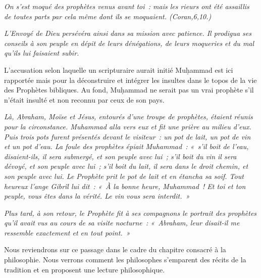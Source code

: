 \emph{On s'est moqué des prophètes venus avant toi~: mais les rieurs ont
été assaillis de toutes parts par cela même dont ils se moquaient.
(Coran,6,10.)}

\emph{L'Envoyé de Dieu persévéra ainsi dans sa mission avec patience. Il
prodigua ses conseils à son peuple en dépit de leurs dénégations, de
leurs moqueries et du mal qu'ils lui faisaient subir.}

L'accusation selon laquelle un scripturaire aurait initié Muḥammad est
ici rapportée mais pour la déconstruire et intégrer les insultes dans le
topos de la vie des Prophètes bibliques. Au fond, Muḥammad ne serait pas
un vrai prophète s'il n'était insulté et non reconnu par ceux de son
pays.


\emph{Là, Abraham, Moïse et Jésus, entourés d'une troupe de prophètes,
étaient réunis pour la circonstance. Muhammad alla vers eux et fit une
prière au milieu d'eux. Puis trois pots furent présentés devant le
visiteur~: un pot de lait, un pot de vin et un pot d'eau. La foule des
prophètes épiait Muhammad~: «~s'il boit de l'eau, disaient-ils, il sera
submergé, et son peuple avec lui~; s'il boit du vin il sera dévoyé, et
son peuple avec lui~; s'il boit du lait, il sera dans le droit chemin,
et son peuple avec lui. Le Prophète prit le pot de lait et en étancha sa
soif. Tout heureux l'ange Gibrîl lui dit~: «~À la bonne heure,
Muhammad~! Et toi et ton peuple, vous êtes dans la vérité. Le vin vous
sera interdit.~»}

\emph{Plus tard, à son retour, le Prophète fit à ses compagnons le
portrait des prophètes qu'il avait vus au cours de sa visite nocturne~:
«~Abraham, leur disait-il me ressemble exactement et en tout point.~»}

Nous reviendrons sur ce passage dans le cadre du chapitre consacré à la
philosophie. Nous verrons comment les philosophes s'emparent des récits
de la tradition et en proposent une lecture philosophique.



